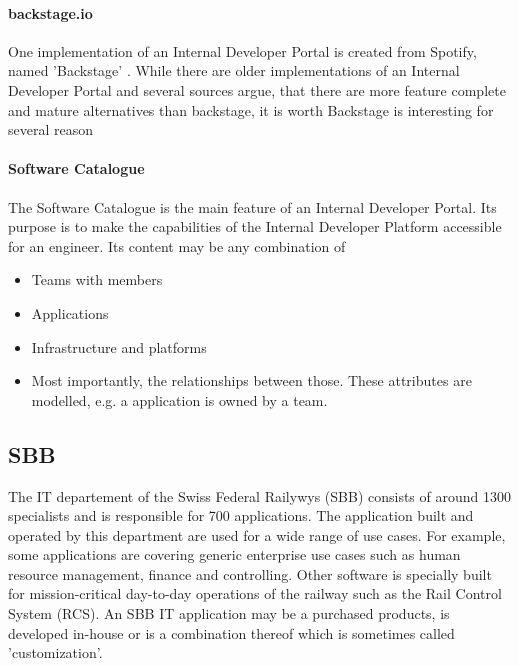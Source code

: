 \documentclass[a4paper,12pt]{article}
\begin{document}
    \paragraph{backstage.io}
    One implementation of an Internal Developer Portal is created from Spotify, named 'Backstage' \parencite{backstageio}.
    While there are older implementations of an Internal Developer Portal and several sources argue, that there are more
    feature complete and mature alternatives than backstage, it is worth Backstage is interesting for several reason
    \paragraph{Software Catalogue}
    The Software Catalogue is the main feature of an Internal Developer Portal.
    Its purpose is to make the capabilities of the Internal Developer Platform accessible for an engineer.
    Its content may be any combination of
    \begin{itemize}
        \item Teams with members
        \item Applications
        \item Infrastructure and platforms
        \item Most importantly, the relationships between those. These attributes are modelled, e.g. a application is owned by a team.
    \end{itemize}



    \subsection{SBB}
    The IT departement of the Swiss Federal Railywys (SBB) consists of around 1300 specialists and is responsible for
    700 applications\parencite{sbbitkennzahlen}.
    The application built and operated by this department are used for a wide range of use cases.
    For example, some applications are covering generic enterprise use cases such as human resource management, finance and controlling.
    Other software is specially built for mission-critical day-to-day operations of the railway such as the Rail Control System (RCS)\parencite{sbbrcs}.
    An SBB IT application may be a purchased products, is developed in-house or is a combination thereof which is sometimes called
    'customization'.
\end{document}

